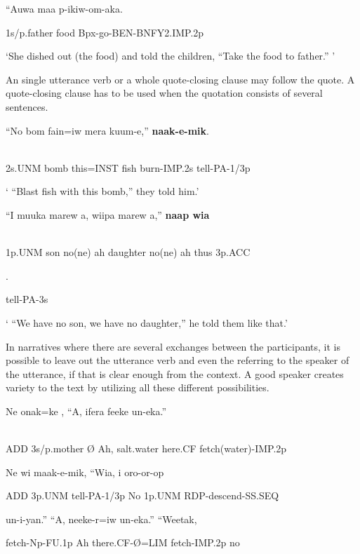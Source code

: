 ``Auwa  maa  p-ikiw-om-aka.

1s/p.father  food  Bpx-go-BEN-BNFY2.IMP.2p

`She dished out (the food) and told the children, ``Take the food to father.'' '

An single utterance verb or a whole quote-closing clause may follow the quote. A quote-closing clause has to be used when the quotation consists of several sentences.

\ea%
\label{ex:x1580}
\gll ``No  bom  fain=iw  mera  kuum-e,''  \textbf{naak-e-mik}. \\
      \\
\glt
\z

2s.UNM  bomb  this=INST  fish  burn-IMP.2s  tell-PA-1/3p

` ``Blast fish with this bomb,'' they told him.'

\ea%
\label{ex:x1583}
\gll ``I  muuka  marew  a,  wiipa  marew  a,''  \textbf{naap  wia} \\
      \\
\glt
\z

1p.UNM  son  no(ne)  ah  daughter  no(ne)  ah  thus  3p.ACC

.

tell-PA-3s

` ``We have no son, we have no daughter,'' he told them like that.'

In narratives where there are several exchanges between the participants, it is possible to leave out the utterance verb and even the  referring to the speaker of the utterance, if that is clear enough from the context. A good speaker creates variety to the text by utilizing all these different possibilities. 

\ea%
\label{ex:x1581}
\gll Ne  onak=ke  \textstyleEmphasizedVernacularWords{{\O}},  ``A,  ifera  feeke  un-eka.'' \\
      \\
\glt
\z

ADD  3s/p.mother  {\O}  Ah,  salt.water  here.CF  fetch(water)-IMP.2p

Ne  wi  maak-e-mik,  ``Wia,  i  oro-or-op

ADD  3p.UNM  tell-PA-1/3p  No  1p.UNM  RDP-descend-SS.SEQ

un-i-yan.''  ``A,  neeke-r=iw  un-eka.''  ``Weetak,

fetch-Np-FU.1p  Ah  there.CF-{\O}=LIM  fetch-IMP.2p  no  

